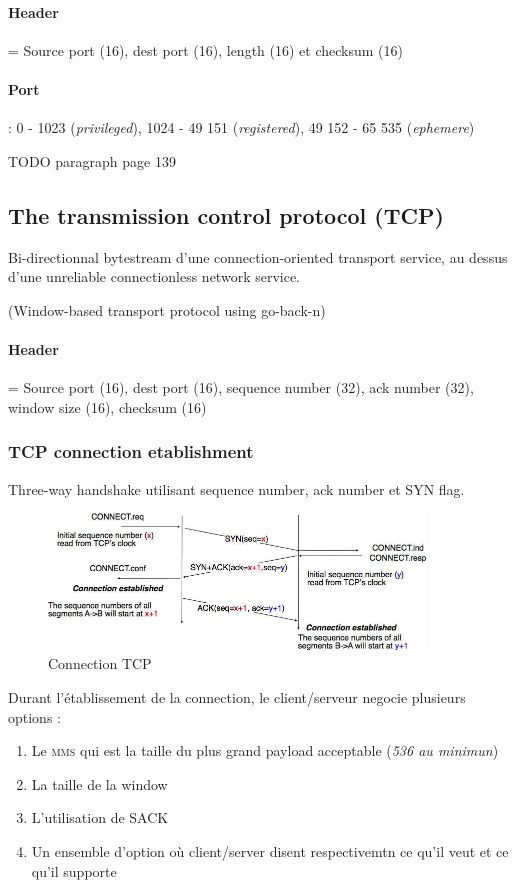 \paragraph{Header} = Source port (16), dest port (16), length (16) et checksum (16)

\paragraph{Port} : 0 - 1023 (\textit{privileged}), 1024 - 49 151 (\textit{registered}),
49 152 - 65 535 (\textit{ephemere})

TODO paragraph page 139

\subsection{The transmission control protocol (TCP)}

Bi-directionnal bytestream d'une connection-oriented transport service, au dessus d'une unreliable connectionless network service.

(Window-based transport protocol using go-back-n)

\paragraph{Header} = Source port (16), dest port (16), sequence number (32), ack number (32),
window size (16), checksum (16)

\subsubsection{TCP connection etablishment}
Three-way handshake utilisant sequence number, ack number et SYN flag.

\begin{figure}[!ht]
  \centering
  \includegraphics[width=10cm]{tcpconnect.jpg}
  \caption{Connection TCP}
  \label{fig:tcpconnect}
\end{figure}

Durant l'établissement de la connection, le client/serveur negocie plusieurs options :
\begin{enumerate}
  \item Le \textsc{mms} qui est la taille du plus grand payload acceptable (\textit{536 au minimun})
  \item La taille de la window
  \item L'utilisation de SACK
  \item Un ensemble d'option où client/server disent respectivemtn ce qu'il veut et ce
    qu'il supporte
\end{enumerate}

